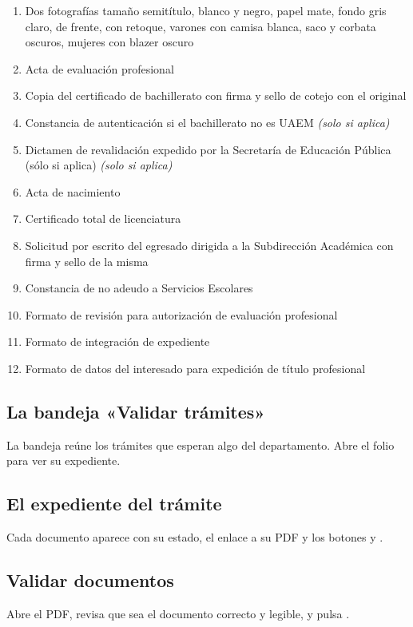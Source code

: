 \begin{enumerate}
  \item Dos fotografías tamaño semitítulo, blanco y negro, papel mate, fondo gris claro, de frente, con retoque, varones con camisa blanca, saco y corbata oscuros, mujeres con blazer oscuro
  \item Acta de evaluación profesional
  \item Copia del certificado de bachillerato con firma y sello de cotejo con el original
  \item Constancia de autenticación si el bachillerato no es UAEM \emph{(solo si aplica)}
  \item Dictamen de revalidación expedido por la Secretaría de Educación Pública (sólo si aplica) \emph{(solo si aplica)}
  \item Acta de nacimiento
  \item Certificado total de licenciatura
  \item Solicitud por escrito del egresado dirigida a la Subdirección Académica con firma y sello de la misma
  \item Constancia de no adeudo a Servicios Escolares
  \item Formato de revisión para autorización de evaluación profesional
  \item Formato de integración de expediente
  \item Formato de datos del interesado para expedición de título profesional
\end{enumerate}
\subsection{La bandeja «Validar trámites»}
La bandeja reúne los trámites que esperan algo del departamento. Abre el folio para ver su expediente.
\subsection{El expediente del trámite}
Cada documento aparece con su estado, el enlace a su PDF y los botones  y .
\subsection{Validar documentos}
Abre el PDF, revisa que sea el documento correcto y legible, y pulsa .
